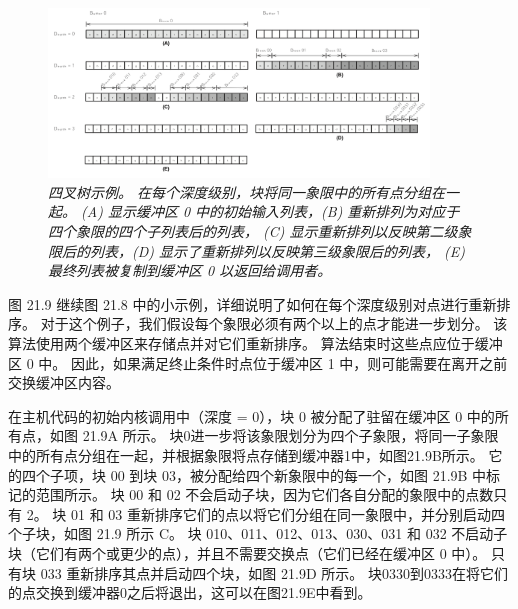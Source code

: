 \begin{figure}[H]
	\centering
	\includegraphics[width=0.9\textwidth]{figs/F21.9.png}
	\caption{\textit{四叉树示例。 在每个深度级别，块将同一象限中的所有点分组在一起。 
	(A) 显示缓冲区 0 中的初始输入列表，(B) 重新排列为对应于四个象限的四个子列表后的列表，
	(C) 显示重新排列以反映第二级象限后的列表，(D) 显示了重新排列以反映第三级象限后的列表，
	(E) 最终列表被复制到缓冲区 0 以返回给调用者。}}
\end{figure}

图 21.9 继续图 21.8 中的小示例，详细说明了如何在每个深度级别对点进行重新排序。 
对于这个例子，我们假设每个象限必须有两个以上的点才能进一步划分。 该算法使用两个缓冲区来存储点并对它们重新排序。 
算法结束时这些点应位于缓冲区 0 中。 因此，如果满足终止条件时点位于缓冲区 1 中，则可能需要在离开之前交换缓冲区内容。

在主机代码的初始内核调用中（深度 = 0），块 0 被分配了驻留在缓冲区 0 中的所有点，如图 21.9A 所示。 
块0进一步将该象限划分为四个子象限，将同一子象限中的所有点分组在一起，并根据象限将点存储到缓冲器1中，如图21.9B所示。 
它的四个子项，块 00 到块 03，被分配给四个新象限中的每一个，如图 21.9B 中标记的范围所示。 
块 00 和 02 不会启动子块，因为它们各自分配的象限中的点数只有 2。
块 01 和 03 重新排序它们的点以将它们分组在同一象限中，并分别启动四个子块，如图 21.9 所示 C。 
块 010、011、012、013、030、031 和 032 不启动子块（它们有两个或更少的点），并且不需要交换点（它们已经在缓冲区 0 中）。 
只有块 033 重新排序其点并启动四个块，如图 21.9D 所示。 
块0330到0333在将它们的点交换到缓冲器0之后将退出，这可以在图21.9E中看到。

